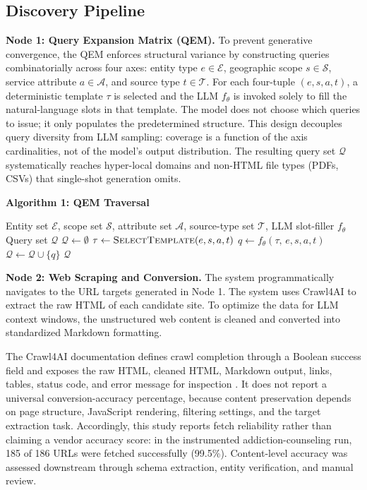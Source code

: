 \documentclass[12pt,oneside]{report}
\begin{document}
\subsection{Discovery Pipeline}

\textbf{Node 1: Query Expansion Matrix (QEM).} To prevent generative convergence, the QEM enforces structural variance by constructing queries combinatorially across four axes: entity type $e \in \mathcal{E}$, geographic scope $s \in \mathcal{S}$, service attribute $a \in \mathcal{A}$, and source type $t \in \mathcal{T}$. For each four-tuple $(e, s, a, t)$, a deterministic template $\tau$ is selected and the LLM $f_\theta$ is invoked solely to fill the natural-language slots in that template. The model does not choose which queries to issue; it only populates the predetermined structure. This design decouples query diversity from LLM sampling: coverage is a function of the axis cardinalities, not of the model's output distribution. The resulting query set $\mathcal{Q}$ systematically reaches hyper-local domains and non-HTML file types (PDFs, CSVs) that single-shot generation omits.

\vspace{4pt}
\noindent\textbf{Algorithm 1: QEM Traversal}
\begin{algorithmic}[1]
\REQUIRE Entity set $\mathcal{E}$, scope set $\mathcal{S}$, attribute set $\mathcal{A}$, source-type set $\mathcal{T}$, LLM slot-filler $f_\theta$
\ENSURE Query set $\mathcal{Q}$
\STATE $\mathcal{Q} \leftarrow \emptyset$
        \STATE $\tau \leftarrow \textsc{SelectTemplate}(e, s, a, t)$
        \STATE $q \leftarrow f_\theta(\tau,\, e, s, a, t)$ \hfill{}
        \STATE $\mathcal{Q} \leftarrow \mathcal{Q} \cup \{q\}$
      \ENDFOR
    \ENDFOR
  \ENDFOR
\ENDFOR
\RETURN $\mathcal{Q}$
\end{algorithmic}
\vspace{4pt}

\textbf{Node 2: Web Scraping and Conversion.} The system programmatically navigates to the URL targets generated in Node 1. The system uses Crawl4AI to extract the raw HTML of each candidate site. To optimize the data for LLM context windows, the unstructured web content is cleaned and converted into standardized Markdown formatting.

The Crawl4AI documentation defines crawl completion through a Boolean success field and exposes the raw HTML, cleaned HTML, Markdown output, links, tables, status code, and error message for inspection \cite{74}. It does not report a universal conversion-accuracy percentage, because content preservation depends on page structure, JavaScript rendering, filtering settings, and the target extraction task. Accordingly, this study reports fetch reliability rather than claiming a vendor accuracy score: in the instrumented addiction-counseling run, 185 of 186 URLs were fetched successfully (99.5\%). Content-level accuracy was assessed downstream through schema extraction, entity verification, and manual review.
\end{document}
